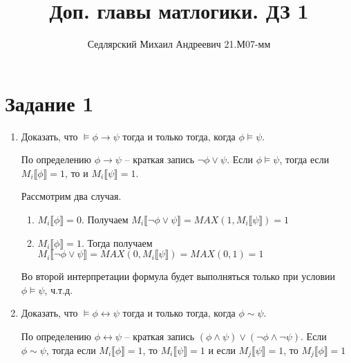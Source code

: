 \documentclass{article}
\title{Доп. главы матлогики. ДЗ 1}
\author{Седлярский Михаил Андреевич 21.М07-мм}
\date{ }
\begin{document}
\maketitle

\section*{Задание 1}
\begin{enumerate}
    \item
        Доказать, что \(\models \phi \rightarrow \psi\) тогда и только тогда, когда \(\phi \models{\psi}\).

        По определению \(\phi \rightarrow \psi\) -- краткая запись \(\neg \phi \lor \psi\).
        Если \(\phi \models{\psi}\), тогда если \(M_i\llbracket \phi \rrbracket = 1\), то и \(M_i\llbracket \psi \rrbracket = 1\).

        Рассмотрим два случая.
        \begin{enumerate}
            \item
                \(M_i\llbracket \phi \rrbracket = 0\).
                Получаем \(M_i\llbracket \neg \phi \lor \psi \rrbracket = MAX(1, M_i\llbracket \psi \rrbracket) = 1\)
            \item
                \(M_i\llbracket \phi \rrbracket = 1\).
                Тогда получаем \(M_i\llbracket \neg \phi \lor \psi \rrbracket = MAX(0, M_i\llbracket \psi \rrbracket) = MAX(0, 1) = 1\)
        \end{enumerate}

        Во второй интерпретации формула будет выполняться только при условии \(\phi \models \psi\), ч.т.д.
    \item
        Доказать, что \(\models \phi \leftrightarrow \psi\) тогда и только тогда, когда \(\phi \sim \psi\).

        По определению \(\phi \leftrightarrow \psi\) -- краткая запись \((\phi \land \psi) \lor (\neg \phi \land \neg \psi)\).
        Если \(\phi \sim \psi\), тогда если \(M_i\llbracket \phi \rrbracket = 1\),
        то \(
        M_i\llbracket \psi \rrbracket = 1\) и если
        \(M_j\llbracket \psi \rrbracket = 1\), то
        \(M_j\llbracket \phi \rrbracket = 1
        \)


\end{enumerate}
\end{document}
